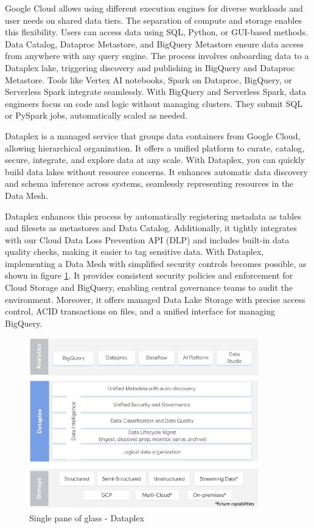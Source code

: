 \documentclass[12pt, a4paper]{book}
\begin{document}
Google Cloud allows using different execution engines for diverse workloads and user needs on shared data tiers. The separation of compute and storage enables this flexibility. Users can access data using SQL, Python, or GUI-based methods. Data Catalog, Dataproc Metastore, and BigQuery Metastore ensure data access from anywhere with any query engine. The process involves onboarding data to a Dataplex lake, triggering discovery and publishing in BigQuery and Dataproc Metastore. Tools like Vertex AI notebooks, Spark on Dataproc, BigQuery, or Serverless Spark integrate seamlessly. With BigQuery and Serverless Spark, data engineers focus on code and logic without managing clusters. They submit SQL or PySpark jobs, automatically scaled as needed.

Dataplex is a managed service that groups data containers from Google Cloud, allowing hierarchical organization. It offers a unified platform to curate, catalog, secure, integrate, and explore data at any scale. With Dataplex, you can quickly build data lakes without resource concerns. It enhances automatic data discovery and schema inference across systems, seamlessly representing resources in the Data Mesh.

Dataplex enhances this process by automatically registering metadata as tables and filesets as metastores and Data Catalog. Additionally, it tightly integrates with our Cloud Data Loss Prevention API (DLP) and includes built-in data quality checks, making it easier to tag sensitive data. With Dataplex, implementing a Data Mesh with simplified security controls becomes possible, as shown in figure \ref{Dataplex}. It provides consistent security policies and enforcement for Cloud Storage and BigQuery, enabling central governance teams to audit the environment. Moreover, it offers managed Data Lake Storage with precise access control, ACID transactions on files, and a unified interface for managing BigQuery.

\begin{figure}[h]
	\begin{framed}
		\centering
		\includegraphics[width=10cm]{Dataplex.png}
		\caption{Single pane of glass - Dataplex}
		\label{Dataplex}
	\end{framed}
\end{figure}
\end{document}
